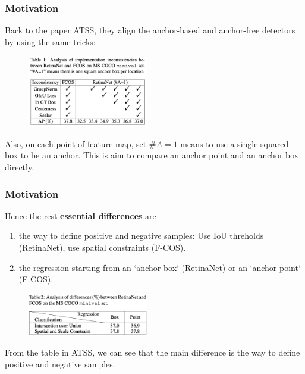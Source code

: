 \documentclass[slidetop, mathserif, dvipsnames]{beamer}
\begin{document}
\begin{frame}
    \frametitle{Motivation}

    Back to the paper ATSS, they align the anchor-based 
    and anchor-free detectors by using the same tricks:

    \begin{figure}
    \includegraphics[width=150pt]{pics/atss_compare.png}
    \end{figure}

    Also, on each point of feature map, set $\#A=1$ means
    to use a single squared box to be an anchor.
    This is aim to compare an anchor point and an anchor box directly.


\end{frame}

\begin{frame}
    \frametitle{Motivation}

    Hence the rest {\bf essential differences} are
    \begin{enumerate}
        \item the way to define positive and negative samples: Use IoU threholds (RetinaNet),
            use spatial constraints (F-COS).
        \item the regression starting from an `anchor box` (RetinaNet)
              or an `anchor point` (F-COS).
    \end{enumerate}

    \begin{figure}
    \includegraphics[width=150pt]{pics/atss_compare2.png}
    \end{figure}
    From the table in ATSS, we can see that the main difference
    is the way to define positive and negative samples.

\end{frame}
\end{document}
